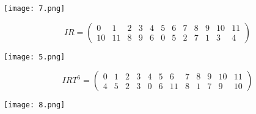	\begin{center}
		\texttt{[image: 7.png]}
	\end{center}
	\bigskip\bigskip
$$
IR=\left(
\begin{array}{cccccccccccc}
0  & 1  &  2  & 3  & 4   & 5  &  6   & 7  & 8  & 9   & 10  & 11  \\
 10& 11& 8& 9& 6& 0& 5& 2& 7& 1& 3& 4
\end{array}
\right)
$$
	\begin{center}
		\texttt{[image: 5.png]}
	\end{center}
	\bigskip\bigskip
$$
{IRT}^6=\left(
\begin{array}{cccccccccccc}
0  & 1  &  2  & 3  & 4   & 5  &  6   & 7  & 8  & 9   & 10  & 11  \\
4& 5& 2& 3& 0& 6& 11& 8& 1& 7& 9& 10
\end{array}
\right)
$$
	\begin{center}
		\texttt{[image: 8.png]}
	\end{center}